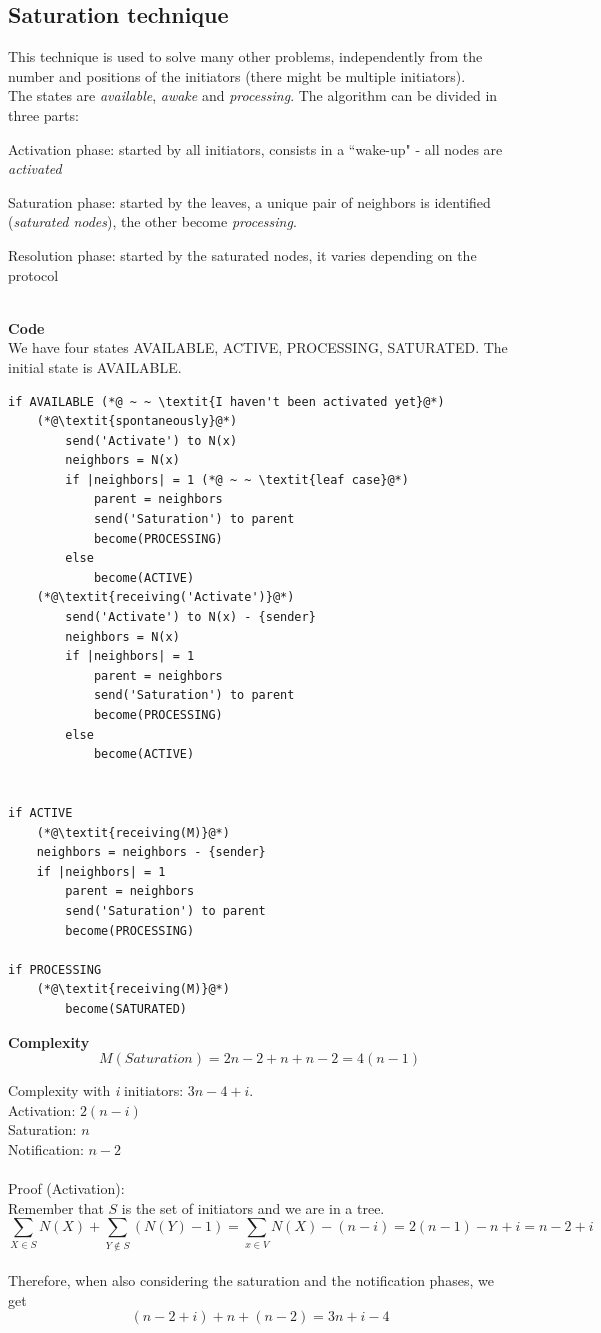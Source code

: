 \documentclass[paper=a4, fontsize=11pt]{scrartcl} %
\numberwithin{equation}{section} %
\numberwithin{figure}{section} %
\numberwithin{table}{section} %
\begin{document}
\subsection*{Saturation technique}
This technique is used to solve many other problems, independently from the number and positions of the initiators (there might be multiple initiators).\\
The states are \textit{available}, \textit{awake} and \textit{processing}. The algorithm can be divided in three parts:
\begin{compactitem}
\item Activation phase: started by all initiators, consists in a ``wake-up" -  all nodes are \textit{activated}
\item Saturation phase: started by the leaves, a unique pair of neighbors is identified (\textit{saturated nodes}), the other become \textit{processing}.
\item Resolution phase: started by the saturated nodes, it varies depending on the protocol
\end{compactitem}~\\
\textbf{Code} \\ We have four states AVAILABLE, ACTIVE, PROCESSING, SATURATED. The initial state is AVAILABLE.
\begin{lstlisting}
if AVAILABLE (*@ ~ ~ \textit{I haven't been activated yet}@*)
	(*@\textit{spontaneously}@*)
		send('Activate') to N(x)
		neighbors = N(x)
		if |neighbors| = 1 (*@ ~ ~ \textit{leaf case}@*)
			parent = neighbors
			send('Saturation') to parent
			become(PROCESSING)
		else
			become(ACTIVE)	
	(*@\textit{receiving('Activate')}@*)
		send('Activate') to N(x) - {sender}
		neighbors = N(x)
		if |neighbors| = 1
			parent = neighbors
			send('Saturation') to parent
			become(PROCESSING)
		else
			become(ACTIVE)


if ACTIVE
	(*@\textit{receiving(M)}@*)
	neighbors = neighbors - {sender}
	if |neighbors| = 1
		parent = neighbors
		send('Saturation') to parent
		become(PROCESSING)

if PROCESSING
	(*@\textit{receiving(M)}@*)
		become(SATURATED)					
\end{lstlisting}


\textbf{Complexity} 
$$M(Saturation) = 2n -2+n+n-2 = 4(n-1)$$ 

Complexity with \textit{i} initiators: $3n - 4 + i$.
\\ 
Activation: $2(n-i)$ \\
Saturation: $n$ \\
Notification: $n-2$ \\
~ \\
Proof (Activation): \\
Remember that $S$ is the set of initiators and we are in a tree.
$$\sum_{X\in S}N(X) + \sum_{Y\notin S} (N(Y) -1) = \sum_{x\in V} N(X) - (n-i) = 2(n-1) - n + i = n-2+i$$ ~ \\
Therefore, when also considering the saturation and the notification phases, we get $$ (n-2+i) + n + (n-2) = 3n + i - 4$$
\end{document}
